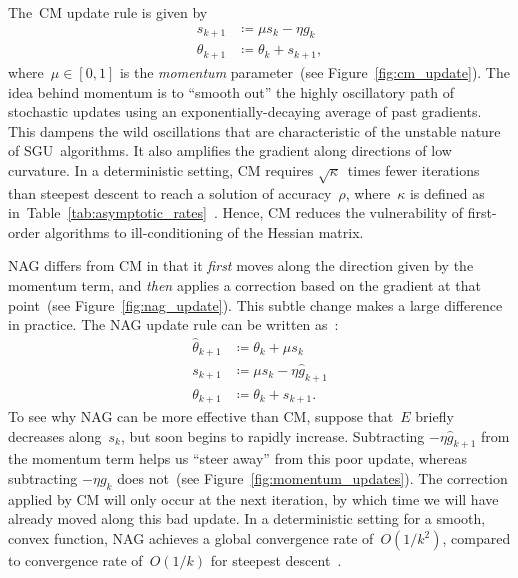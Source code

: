 \documentclass[11pt,a4paper]{article}
\numberwithin{equation}{section}
\begin{document}
The~CM update rule is given by
\begin{align*}
	s_{k + 1} &\coloneqq \mu s_k - \eta g_k \\
	\theta_{k + 1} &\coloneqq \theta_k + s_{k + 1},
\end{align*}
where~$\mu \in [0, 1]$ is the \emph{momentum} parameter~(see
Figure~\ref{fig:cm_update}). The idea behind momentum is to ``smooth out'' the
highly oscillatory path of stochastic updates using an exponentially-decaying
average of past gradients. This dampens the wild oscillations that are
characteristic of the unstable nature of SGU~algorithms. It also amplifies the
gradient along directions of low curvature. In a deterministic setting, CM
requires $\sqrt{\kappa}$~times fewer iterations than steepest descent to reach a
solution of accuracy~$\rho$, where~$\kappa$ is defined as
in~Table~\ref{tab:asymptotic_rates}~\citep{sutskever2013importance}.  Hence, CM
reduces the vulnerability of first-order algorithms to ill-conditioning of the
Hessian matrix.

NAG differs from CM in that it \emph{first} moves along the direction given by
the momentum term, and \emph{then} applies a correction based on the gradient at
that point~(see Figure~\ref{fig:nag_update}). This subtle change makes a large
difference in practice. The NAG update rule can be written
as~\citep{sutskever2013importance}:
\begin{align*}
	\hat{\theta}_{k + 1} &\coloneqq \theta_k + \mu s_k \\
	s_{k + 1}            &\coloneqq \mu s_k - \eta \hat{g}_{k + 1} \\
	\theta_{k + 1}       &\coloneqq \theta_k + s_{k + 1}.
\end{align*}
To see why NAG can be more effective than CM, suppose that~$E$ briefly decreases
along~$s_k$, but soon begins to rapidly increase. Subtracting $-\eta \hat{g}_{k
+ 1}$ from the momentum term helps us ``steer away'' from this poor update,
whereas subtracting $-\eta g_k$ does not~(see
Figure~\ref{fig:momentum_updates}). The correction applied by CM will only occur
at the next iteration, by which time we will have already moved along this bad
update. In a deterministic setting for a smooth, convex function, NAG achieves a
global convergence rate of~$O(1 / k^2)$, compared to convergence rate of~$O(1 /
k)$ for steepest descent~\citep{sutskever2013importance}.
\end{document}
